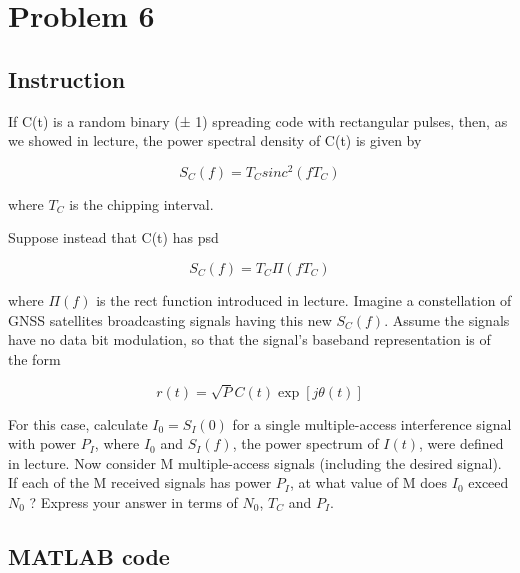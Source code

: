\section{Problem 6}

\subsection{Instruction}

If C(t) is a random binary (± 1) spreading code with rectangular pulses, then,
as we showed in lecture, the power spectral density of C(t) is given by

\begin{equation}
	S_C (f) = T_C sinc^2 (f T_C )
\end{equation}

where $T_C$ is the chipping interval.

Suppose instead that C(t) has psd

\begin{equation}
	S_C (f) = T_C \Pi(f T_C )
\end{equation}

where $\Pi(f)$ is the rect function introduced in lecture. Imagine a
constellation of GNSS satellites broadcasting signals having this new $S_C (f)$.
Assume the signals have no data bit modulation, so that the signal’s baseband
representation is of the form

\begin{equation}
	r(t) = \sqrt{P} C(t) \exp[j \theta(t)]
\end{equation}

For this case, calculate $I_0 = S_I(0)$ for a single multiple-access interference
signal with power $P_I$, where $I_0$ and $S_I (f)$, the power spectrum of $I(t)$,
were defined in lecture. Now consider M multiple-access signals (including the
desired signal). If each of the M received signals has power $P_I$, at what value
of M does $I_0$ exceed $N_0$ ? Express your answer in terms of $N_0$, $T_C$ and
$P_I$.

\subsection{MATLAB code}

